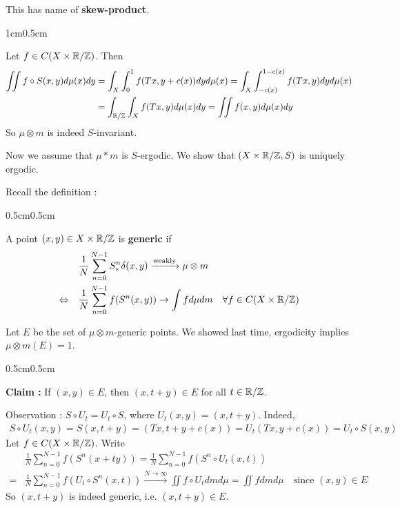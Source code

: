\documentclass[12pt,a4paper]{report}
\newenvironment{proof}
{\begin{changemargin}{1cm}{0.5cm} 
	}%
	{\end{changemargin}
}
\newenvironment{subproof}
{\begin{changemargin}{0.5cm}{0.5cm}
	}%
	{\end{changemargin}
}
\begin{document}
This has name of \textbf{skew-product}.
\begin{proof}
\pf Let $f \in C(X \times \mathbb{R}/\mathbb{Z})$. Then
\begin{align*}
\iint f\circ S(x,y) d\mu(x)dy  &= \int_X \int_0^1 f(Tx,y+c(x)) dyd\mu(x) = \int_X \int_{-c(x)}^{1-c(x)} f(Tx,y)dyd\mu (x) \\
&= \int_{\mathbb{R}/\mathbb{Z}}\int_X f(Tx,y)d\mu(x)dy = \iint f(x,y)d\mu(x)dy
\end{align*}
So $\mu \otimes m$ is indeed $S$-invariant.
\s

Now we assume that $\mu *m$ is $S$-ergodic. We show that $(X\times \mathbb{R}/\mathbb{Z},S)$ is uniquely ergodic.
\s

Recall the definition :

\begin{subproof}
 A point $(x,y) \in X\times \mathbb{R}/\mathbb{Z}$ is \textbf{generic} if
\begin{align*}
& \frac{1}{N} \sum_{n=0}^{N-1} S^n_* \delta(x,y) \xrightarrow{\text{weakly}} \mu \otimes m \\
\Leftrightarrow \quad & \frac{1}{N}\sum_{n=0}^{N-1} f(S^n(x,y)) \rightarrow \int fd\mu dm \quad \forall f\in C(X\times \mathbb{R}/\mathbb{Z})
\end{align*}
\end{subproof}
\s

Let $E$ be the set of $\mu \otimes m$-generic points. We showed last time, ergodicity implies $\mu \otimes m(E) =1$.
\s

\begin{subproof}
\textbf{Claim : } If $(x,y) \in E$, then $(x,t+y) \in E$ for all $t\in \mathbb{R}/\mathbb{Z}$.

\pf Observation : $S\circ U_t = U_t \circ S$, where $U_t(x,y)=(x,t+y)$. Indeed,
\begin{align*}
S\circ U_t(x,y) = S(x,t+y) = (Tx,t+y+c(x)) =U_t(Tx,y+c(x)) =  U_t \circ S(x,y)
\end{align*}
Let $f\in C(X\times \mathbb{R}/\mathbb{Z})$. Write
\begin{align*}
&\frac{1}{N} \sum_{n=0}^{N-1} f(S^n(x+ty)) = \frac{1}{N}\sum_{n=0}^{N-1} f(S^n \circ U_t(x,t)) \\
= & \frac{1}{N}\sum_{n=0}^{N-1} f(U_t \circ S^n(x,t)) \xrightarrow{N\rightarrow \infty} \iint f\circ U_t dm d\mu = \iint f dmd\mu \quad \text{since } (x,y) \in E
\end{align*}
So $(x,t+y)$ is indeed generic, i.e. $(x,t+y) \in E$.
\end{subproof}
\s


\end{proof}
\end{document}
